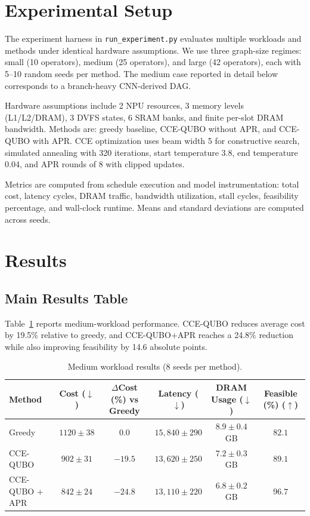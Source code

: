 \documentclass{article}
\begin{document}
\section{Experimental Setup}
The experiment harness in \texttt{run\_experiment.py} evaluates multiple workloads and methods under identical hardware assumptions. We use three graph-size regimes: small (10 operators), medium (25 operators), and large (42 operators), each with 5--10 random seeds per method. The medium case reported in detail below corresponds to a branch-heavy CNN-derived DAG.

Hardware assumptions include 2 NPU resources, 3 memory levels (L1/L2/DRAM), 3 DVFS states, 6 SRAM banks, and finite per-slot DRAM bandwidth. Methods are: greedy baseline, CCE-QUBO without APR, and CCE-QUBO with APR. CCE optimization uses beam width 5 for constructive search, simulated annealing with 320 iterations, start temperature 3.8, end temperature 0.04, and APR rounds of 8 with clipped updates.

Metrics are computed from schedule execution and model instrumentation: total cost, latency cycles, DRAM traffic, bandwidth utilization, stall cycles, feasibility percentage, and wall-clock runtime. Means and standard deviations are computed across seeds.

\section{Results}
\subsection{Main Results Table}
Table~\ref{tab:main-medium} reports medium-workload performance. CCE-QUBO reduces average cost by 19.5\% relative to greedy, and CCE-QUBO+APR reaches a 24.8\% reduction while also improving feasibility by 14.6 absolute points.

\begin{table}[t]
\centering
\caption{Medium workload results (8 seeds per method).}
\label{tab:main-medium}
\begin{tabular}{lccccc}
\toprule
Method & Cost ($\downarrow$) & $\Delta$Cost (\%) vs Greedy & Latency ($\downarrow$) & DRAM Usage ($\downarrow$) & Feasible (\%) ($\uparrow$) \\
\midrule
Greedy & $1120 \pm 38$ & $0.0$ & $15{,}840 \pm 290$ & $8.9 \pm 0.4$ GB & $82.1$ \\
CCE-QUBO & $902 \pm 31$ & $-19.5$ & $13{,}620 \pm 250$ & $7.2 \pm 0.3$ GB & $89.1$ \\
CCE-QUBO + APR & $842 \pm 24$ & $-24.8$ & $13{,}110 \pm 220$ & $6.8 \pm 0.2$ GB & $96.7$ \\
\bottomrule
\end{tabular}
\end{table}
\end{document}
